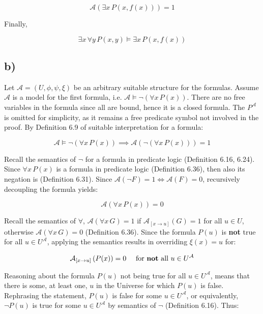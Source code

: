 \documentclass[unicode,11pt,a4paper,oneside,numbers=endperiod,openany]{scrartcl}
\def\struct{\mathcal{A}}
\begin{document}
\[
\struct (\exists x \, P(x, f(x))) = 1 
\]

\noindent Finally,

\[
\exists x \, \forall y \, P(x,y) \models \exists x \, P(x,f(x))
\]

\subsection*{b)}

Let \( \struct = (U, \phi, \psi, \xi) \) be an arbitrary suitable structure for the formulas.
Assume \( \struct \) is a model for the first formula, 
i.e. \( \struct \models \neg (\forall x \, P(x)) \).
There are no free variables in the formula since all are bound, hence it is a closed formula. 
The \( P^\struct \) is omitted for simplicity, as it remains a free predicate symbol 
not involved in the proof.
By Definition 6.9 of suitable interpretation for a formula:

\[
\struct \models \neg (\forall x \, P(x)) 
\implies 
\struct\left( 
     \neg (\forall x \, P(x))
\right) = 1
\]

\noindent Recall the semantics of \( \neg \) for a formula in predicate logic
(Definition 6.16, 6.24).
Since \( \forall x \, P(x) \) is a formula in predicate logic (Definition 6.36), 
then also its negation is (Definition 6.31). 
Since \( \struct(\neg F) = 1 \iff \struct(F) = 0 \), recursively decoupling the formula yields:

\[
\struct\left( 
    \forall x \, P(x)
\right) = 0
\]

\noindent Recall the semantics of \( \forall \),
\( \struct(\forall x \, G) = 1 \) if \( \struct_{[x \to u]}(G) = 1 \) for all \( u \in U \),
otherwise \( \struct(\forall x \, G) = 0 \) 
(Definition 6.36).
Since the formula \( P(u) \) is \textbf{not} true for all \( u \in U^\struct \),
applying the semantics results in overriding \( \xi(x) = u \) for:

\[
\struct_{[x \to u]}\left( 
    P(x)
\right) = 0
\quad
\text{ for \textbf{not} all } u \in U^\struct
\]

\noindent Reasoning about the formula \( P(u) \) not being true for all \( u \in U^\struct \),
means that there is some, at least one, \( u \) in the Universe for which \( P(u) \) is false.
Rephrasing the statement, \( P(u) \) is false for some \( u \in U^\struct \),
or equivalently, \( \neg P(u) \) is true for some \( u \in U^\struct \) 
by semantics of \( \neg \)
(Definition 6.16).
Thus:
\end{document}
